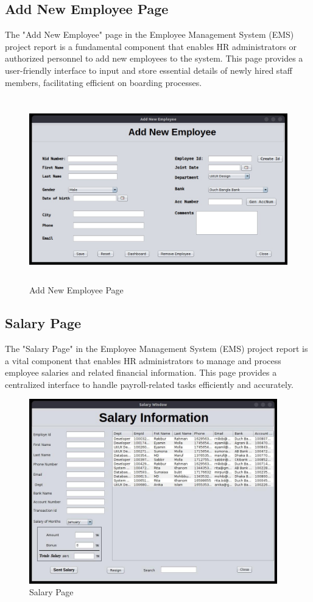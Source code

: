 \subsection{Add New Employee Page}
The "Add New Employee" page in the Employee Management System (EMS) project report is a
fundamental component that enables HR administrators or authorized personnel to add new
employees to the system. This page provides a user-friendly interface to input and store essential
details of newly hired staff members, facilitating efficient on boarding processes.
\begin{figure}[h]
    \centering
    \includegraphics[height=8cm]{img/appsimg/addnwe.png}
    \caption{Add New Employee Page}
    \label{fig:addnewempl}
\end{figure}
\subsection{Salary Page}
The "Salary Page" in the Employee Management System (EMS) project report is a vital component
that enables HR administrators to manage and process employee salaries and related financial
information. This page provides a centralized interface to handle payroll-related tasks efficiently
and accurately.
\begin{figure}[h]
    \centering
    \includegraphics[height=8cm]{img/appsimg/slara.png}
    \caption{Salary Page}
    \label{fig:salary}
\end{figure}
